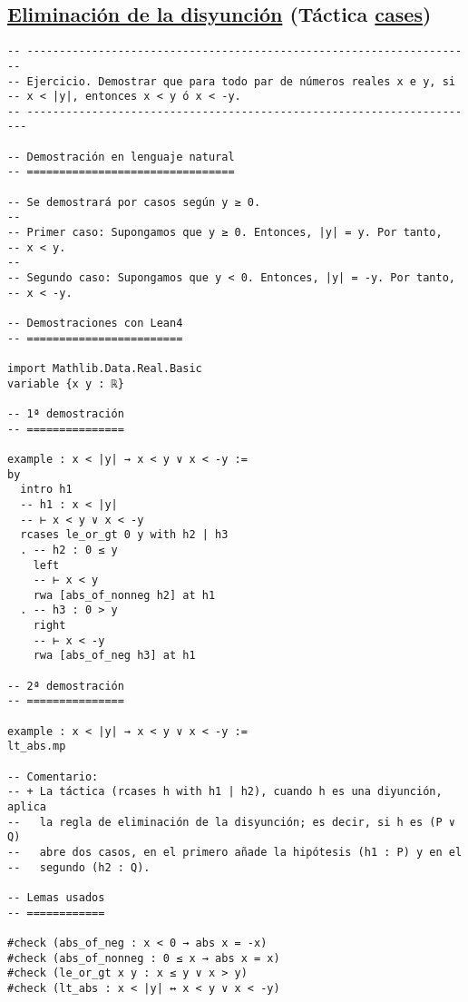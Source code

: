 \subsection{\href{./src/Logica/Eliminacion\_de\_la\_disyuncion.lean}{Eliminación de la disyunción} (Táctica \href{https://bit.ly/3dowIEO}{cases})}
\label{sec:org9b1dc1e}
\begin{verbatim}
-- ---------------------------------------------------------------------
-- Ejercicio. Demostrar que para todo par de números reales x e y, si
-- x < |y|, entonces x < y ó x < -y.
-- ----------------------------------------------------------------------

-- Demostración en lenguaje natural
-- ================================

-- Se demostrará por casos según y ≥ 0.
--
-- Primer caso: Supongamos que y ≥ 0. Entonces, |y| = y. Por tanto,
-- x < y.
--
-- Segundo caso: Supongamos que y < 0. Entonces, |y| = -y. Por tanto,
-- x < -y.

-- Demostraciones con Lean4
-- ========================

import Mathlib.Data.Real.Basic
variable {x y : ℝ}

-- 1ª demostración
-- ===============

example : x < |y| → x < y ∨ x < -y :=
by
  intro h1
  -- h1 : x < |y|
  -- ⊢ x < y ∨ x < -y
  rcases le_or_gt 0 y with h2 | h3
  . -- h2 : 0 ≤ y
    left
    -- ⊢ x < y
    rwa [abs_of_nonneg h2] at h1
  . -- h3 : 0 > y
    right
    -- ⊢ x < -y
    rwa [abs_of_neg h3] at h1

-- 2ª demostración
-- ===============

example : x < |y| → x < y ∨ x < -y :=
lt_abs.mp

-- Comentario:
-- + La táctica (rcases h with h1 | h2), cuando h es una diyunción, aplica
--   la regla de eliminación de la disyunción; es decir, si h es (P ∨ Q)
--   abre dos casos, en el primero añade la hipótesis (h1 : P) y en el
--   segundo (h2 : Q).

-- Lemas usados
-- ============

#check (abs_of_neg : x < 0 → abs x = -x)
#check (abs_of_nonneg : 0 ≤ x → abs x = x)
#check (le_or_gt x y : x ≤ y ∨ x > y)
#check (lt_abs : x < |y| ↔ x < y ∨ x < -y)
\end{verbatim}

